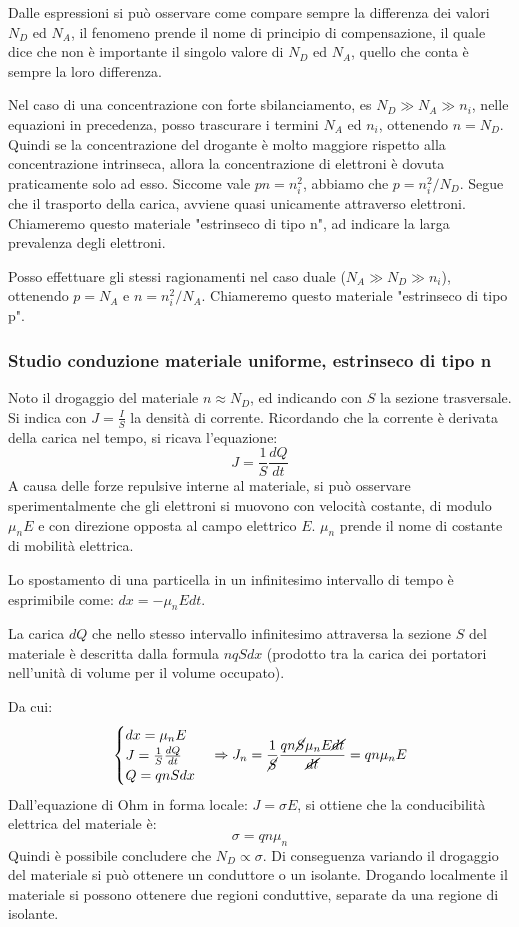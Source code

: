 \documentclass[../template]{subfiles}
\begin{document}
Dalle espressioni si può osservare come compare sempre la differenza dei valori $N_D$ ed $N_A$, il fenomeno prende il nome di principio di compensazione, il quale dice che non è importante il singolo valore di $N_D$ ed $N_A$, quello che conta è sempre la loro differenza.


Nel caso di una concentrazione con forte sbilanciamento, es $N_D \gg N_A \gg n_i$, nelle equazioni in precedenza, posso trascurare i termini $N_A$ ed $n_i$, ottenendo $n = N_D$.
Quindi se la concentrazione del drogante è molto maggiore rispetto alla concentrazione intrinseca, allora la concentrazione di elettroni è dovuta praticamente solo ad esso.
Siccome vale $pn = n_i^2$, abbiamo che $p = n_i^2 / N_D$. Segue che il trasporto della carica, avviene quasi unicamente attraverso elettroni.
\\
Chiameremo questo materiale "estrinseco di tipo n", ad indicare la larga prevalenza degli elettroni.

Posso effettuare gli stessi ragionamenti nel caso duale ($N_A \gg N_D \gg n_i$), ottenendo $p = N_A$ e $n = n_i^2 / N_A$.
Chiameremo questo materiale "estrinseco di tipo p".

\subsubsection{Studio conduzione materiale uniforme, estrinseco di tipo n}
Noto il drogaggio del materiale $n \approx N_D$, ed indicando con $S$ la sezione trasversale. Si indica con $J = \frac{I}{S}$ la densità di corrente.
Ricordando che la corrente è derivata della carica nel tempo, si ricava l'equazione:
\[
    J = \frac{1}{S}\frac{dQ}{dt}
\]
A causa delle forze repulsive interne al materiale, si può osservare sperimentalmente che gli elettroni si muovono con velocità costante, di modulo
$\mu_n E$ e con direzione opposta al campo elettrico $E$. $\mu_n$ prende il nome di costante di mobilità elettrica.

Lo spostamento di una particella in un infinitesimo intervallo di tempo è esprimibile come: $dx = -\mu_n E dt$.

La carica $dQ$ che nello stesso intervallo infinitesimo attraversa la sezione $S$ del materiale è descritta dalla formula $nqSdx$ (prodotto tra la carica dei portatori nell'unità di volume per il volume occupato).

Da cui:
\[
    \begin{cases}
        dx = \mu_n E
        \\
        J = \frac{1}{S} \frac{dQ}{dt}
        \\
        Q = qnS dx
    \end{cases}
    \Rightarrow
    J_n = \frac{1}{\cancel{S}} \frac{qn\cancel{S} \mu_n E \cancel{dt}}{\cancel{dt}} = qn\mu_n E
\]
Dall'equazione di Ohm in forma locale: $J = \sigma E$, si ottiene che la conducibilità elettrica del materiale è:
\[
    \sigma = q n \mu_n
\]
Quindi è possibile concludere che $N_D \propto \sigma$. Di conseguenza variando il drogaggio del materiale si può ottenere
un conduttore o un isolante.
Drogando localmente il materiale si possono ottenere due regioni conduttive, separate da una regione di isolante.
\end{document}
